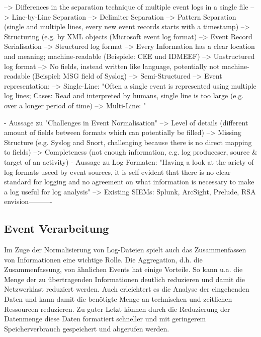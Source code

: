 	--> Differences in the separation technique of multiple event logs in a single file
		--> Line-by-Line Separation
		--> Delimiter Separation
		--> Pattern Separation (single and multiple lines, every new event records starts with a timestamp)
		--> Structuring (e.g. by XML objects (Microsoft event log format)
	--> Event Record Serialisation
		--> Structured log format --> Every Information has a clear location and meaning; machine-readable (Beispiele: CEE und IDMEEF)
		--> Unstructured log format --> No fields, instead written like language, potentially not machine-readable (Beispiel: MSG field of Syslog)
		--> Semi-Structured
	--> Event representation: 
		--> Single-Line: "Often a single event is represented using multiple log lines; Cases: Read and interpreted by humans, single line is too large (e.g. over a longer period of time)
		--> Multi-Line: "

- Aussage zu "Challenges in Event Normalisation"
	--> Level of details (different amount of fields between formats which can potentially be filled)
	--> Missing Structure (e.g. Syslog and Snort, challenging because there is no direct mapping to fields)
	--> Completeness (not enough information, e.g. log produceser, source \& target of an activity)
- Aussage zu Log Formaten: "Having a look at the ariety of log formats useed by event sources, it is self evident that there is no clear standard for logging and no agreement on what information is necessary to make a log useful for log analysis"
	--> Existing SIEMs: Splunk, ArcSight, Prelude, RSA envision----------






\subsection{Event Verarbeitung}
\label{cha:Event Verarbeitung}
Im Zuge der Normalisierung von Log-Dateien spielt auch das Zusammenfassen von Informationen eine wichtige Rolle. Die Aggregation, d.h. die Zusammenfassung, von ähnlichen Events hat einige Vorteile. So kann u.a. die Menge der zu übertragenden Informationen deutlich reduzieren und damit die Netzwerklast reduziert werden. Auch erleichtert es die Analyse der eingehenden Daten und kann damit die benötigte Menge an technischen und zeitlichen Ressourcen reduzieren. Zu guter Letzt können durch die Reduzierung der Datenmenge diese Daten formatiert schneller und mit geringerem Speicherverbrauch gespeichert und abgerufen werden.

